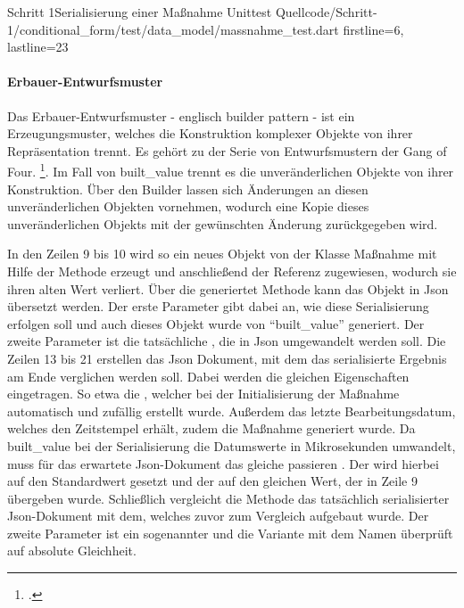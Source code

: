 \begin{alexlisting}{Schritt 1}{Serialisierung einer Maßnahme Unittest}
  {Quellcode/Schritt-1/conditional_form/test/data_model/massnahme_test.dart}
  {firstline=6, lastline=23}
  \label{lst:SerialisierungEinerMassnahmeUnittest}
\end{alexlisting}

\paragraph{Erbauer-Entwurfsmuster} Das Erbauer-Entwurfsmuster - englisch builder pattern - ist ein Erzeugungsmuster, welches die Konstruktion komplexer Objekte von ihrer Repräsentation trennt.
Es gehört zu der Serie von Entwurfsmustern der Gang of Four. \footcite[Vgl.][S. 119]{gamma2009entwurfsmuster}. Im Fall von built_value trennt es die unveränderlichen Objekte von ihrer Konstruktion. Über den Builder lassen sich Änderungen an diesen unveränderlichen Objekten vornehmen, wodurch eine Kopie dieses unveränderlichen Objekts mit der gewünschten Änderung zurückgegeben wird.

In den Zeilen 9 bis 10 wird so ein neues Objekt von der Klasse Maßnahme mit Hilfe der Methode  erzeugt und anschließend der Referenz  zugewiesen, wodurch sie ihren alten Wert verliert.
Über die generiertet Methode   kann das Objekt in Json übersetzt werden. Der erste Parameter  gibt dabei an, wie diese Serialisierung erfolgen soll und auch dieses Objekt wurde von \enquote{built_value} generiert. Der zweite Parameter ist die tatsächliche , die in Json umgewandelt werden soll. Die Zeilen 13 bis 21 erstellen das Json Dokument, mit dem das serialisierte Ergebnis am Ende verglichen werden soll. Dabei werden die gleichen Eigenschaften eingetragen. So etwa die , welcher bei der Initialisierung der Maßnahme automatisch und zufällig erstellt wurde. Außerdem das letzte Bearbeitungsdatum, welches den Zeitstempel erhält, zudem die Maßnahme generiert wurde. Da built_value bei der Serialisierung die Datumswerte in Mikrosekunden umwandelt, muss für das erwartete Json-Dokument das gleiche passieren . Der   wird hierbei auf den Standardwert  gesetzt und der   auf den gleichen Wert, der in Zeile 9 übergeben wurde.
Schließlich vergleicht die Methode  das tatsächlich serialisierter Json-Dokument mit dem, welches zuvor zum Vergleich aufgebaut wurde.
Der zweite Parameter ist ein sogenannter  und die Variante mit dem Namen  überprüft auf absolute Gleichheit.



